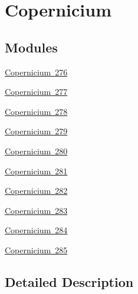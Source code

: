 \hypertarget{group___isotope_const-_copernicium}{}\section{Copernicium}
\label{group___isotope_const-_copernicium}
\subsection*{Modules}
\begin{DoxyCompactItemize}
\item 
\mbox{\hyperlink{group___isotope_const-_copernicium-_cn276}{Copernicium 276}}
\item 
\mbox{\hyperlink{group___isotope_const-_copernicium-_cn277}{Copernicium 277}}
\item 
\mbox{\hyperlink{group___isotope_const-_copernicium-_cn278}{Copernicium 278}}
\item 
\mbox{\hyperlink{group___isotope_const-_copernicium-_cn279}{Copernicium 279}}
\item 
\mbox{\hyperlink{group___isotope_const-_copernicium-_cn280}{Copernicium 280}}
\item 
\mbox{\hyperlink{group___isotope_const-_copernicium-_cn281}{Copernicium 281}}
\item 
\mbox{\hyperlink{group___isotope_const-_copernicium-_cn282}{Copernicium 282}}
\item 
\mbox{\hyperlink{group___isotope_const-_copernicium-_cn283}{Copernicium 283}}
\item 
\mbox{\hyperlink{group___isotope_const-_copernicium-_cn284}{Copernicium 284}}
\item 
\mbox{\hyperlink{group___isotope_const-_copernicium-_cn285}{Copernicium 285}}
\end{DoxyCompactItemize}


\subsection{Detailed Description}
